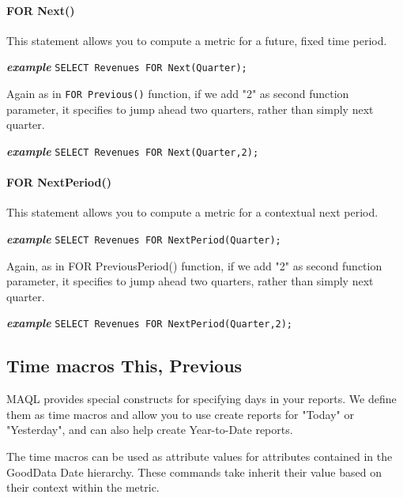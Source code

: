 \documentclass[a4paper, 12pt, titlepage, fleqn]{article}
\begin{document}
\paragraph*{FOR Next()}
This statement allows you to compute a metric for a future, fixed time period.

\textbf{\emph{example}}  \hspace{.9cm}\verb=SELECT Revenues FOR Next(Quarter);=

Again as in \verb=FOR Previous()= function, if we add "2" as second function parameter, it specifies to jump ahead two quarters, rather than simply next quarter.

\textbf{\emph{example}}  \hspace{.9cm}\verb=SELECT Revenues FOR Next(Quarter,2);=

\paragraph*{FOR NextPeriod()}
This statement allows you to compute a metric for a contextual next period.

\textbf{\emph{example}}  \hspace{.9cm}\verb=SELECT Revenues FOR NextPeriod(Quarter);=

Again, as in FOR PreviousPeriod() function, if we add "2" as second function parameter, it specifies to jump ahead two quarters, rather than simply next quarter.

\textbf{\emph{example}}  \hspace{.9cm}\verb=SELECT Revenues FOR NextPeriod(Quarter,2);=

\subsection{Time macros {This}, {Previous}} 
\label{timemcr}
MAQL provides special constructs for specifying days in your reports. We define them as time macros and allow you to use create reports for "Today" or "Yesterday", and can also help create Year-to-Date reports.

The time macros can be used as attribute values for attributes contained in the GoodData Date hierarchy. These commands take inherit their value based on their context within the metric.
\end{document}
